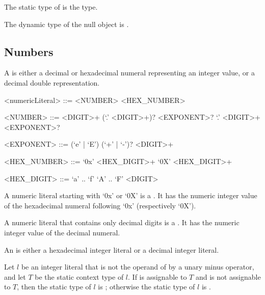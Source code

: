 \documentclass[makeidx]{article}
\begin{document}
{

\LMHash{}%
The static type of \NULL{} is the  type.


\LMHash{}%
The dynamic type of the null object is .


\subsection{Numbers}

\LMHash{}%
A 
is either a decimal or hexadecimal numeral representing an integer value,
or a decimal double representation.

\begin{grammar}
<numericLiteral> ::= <NUMBER>
  \alt <HEX\_NUMBER>

<NUMBER> ::= <DIGIT>+ (`.' <DIGIT>+)? <EXPONENT>?
  \alt `.' <DIGIT>+ <EXPONENT>?

<EXPONENT> ::= (`e' | `E') (`+' | `-')? <DIGIT>+

<HEX\_NUMBER> ::= `0x' <HEX\_DIGIT>+
  \alt `0X' <HEX\_DIGIT>+

<HEX\_DIGIT> ::= `a' .. `f'
  \alt `A' .. `F'
  \alt <DIGIT>
\end{grammar}

\LMHash{}%
A numeric literal starting with `0x' or `0X'
is a .
It has the numeric integer value of the hexadecimal numeral
following `0x' (respectively `0X').

\LMHash{}%
A numeric literal that contains only decimal digits is a
.
It has the numeric integer value of the decimal numeral.

\LMHash{}%
An 
is either a hexadecimal integer literal or a decimal integer literal.

\LMHash{}%
Let $l$ be an integer literal that is not the operand
of by a unary minus operator,
and let $T$ be the static context type of $l$.
If  is assignable to $T$ and  is not assignable to $T$,
then the static type of $l$ is ;
otherwise the static type of $l$ is .


}
\end{document}
